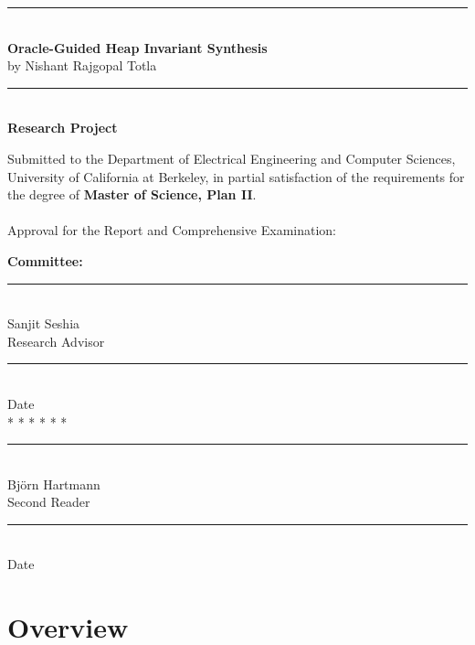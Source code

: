 \documentclass[12pt, letterpaper]{report}
\begin{document}
\large
\begin{center}
\rule[.1in]{6.5in}{.01in}\\
{\bf Oracle-Guided Heap Invariant Synthesis}\\
by Nishant Rajgopal Totla\\
\rule[.1in]{6.5in}{.01in}\\
{\bf Research Project}\\
\noindent
\end{center}
\normalsize
Submitted to the Department of Electrical Engineering and Computer
Sciences, University of California at Berkeley, in partial satisfaction
of the requirements for the degree of {\bf Master of Science, Plan II}.
\\
\\
\noindent
Approval for the Report and Comprehensive Examination:
\begin{center}
{\bf Committee:}\\
\vspace{9.5 mm}
\rule{3.5in}{.01in}\\
Sanjit Seshia\\
Research Advisor\\
\vspace{9.5 mm}
\rule{3.5in}{.01in}\\
Date\\
\vspace{7 mm}
* * * * * *\\
\vspace{9.5 mm}
\rule{3.5in}{.01in}\\
Bj{\"o}rn Hartmann\\
Second Reader\\
\vspace{9.5 mm}
\rule{3.5in}{.01in}\\
Date\\
\end{center}



\tableofcontents
\listoffigures

% 

\chapter{Overview}

\end{document}
